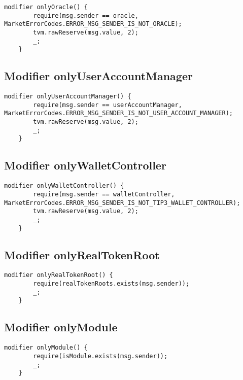 \begin{lstlisting}[firstnumber=515]
    modifier onlyOracle() {
        require(msg.sender == oracle, MarketErrorCodes.ERROR_MSG_SENDER_IS_NOT_ORACLE);
        tvm.rawReserve(msg.value, 2);
        _;
    }
\end{lstlisting}

\subsection{Modifier onlyUserAccountManager}


\begin{lstlisting}[firstnumber=521]
    modifier onlyUserAccountManager() {
        require(msg.sender == userAccountManager, MarketErrorCodes.ERROR_MSG_SENDER_IS_NOT_USER_ACCOUNT_MANAGER);
        tvm.rawReserve(msg.value, 2);
        _;
    }
\end{lstlisting}

\subsection{Modifier onlyWalletController}


\begin{lstlisting}[firstnumber=527]
    modifier onlyWalletController() {
        require(msg.sender == walletController, MarketErrorCodes.ERROR_MSG_SENDER_IS_NOT_TIP3_WALLET_CONTROLLER);
        tvm.rawReserve(msg.value, 2);
        _;
    }
\end{lstlisting}

\subsection{Modifier onlyRealTokenRoot}


\begin{lstlisting}[firstnumber=533]
    modifier onlyRealTokenRoot() {
        require(realTokenRoots.exists(msg.sender));
        _;
    }
\end{lstlisting}

\subsection{Modifier onlyModule}


\begin{lstlisting}[firstnumber=538]
    modifier onlyModule() {
        require(isModule.exists(msg.sender));
        _;
    }
\end{lstlisting}

